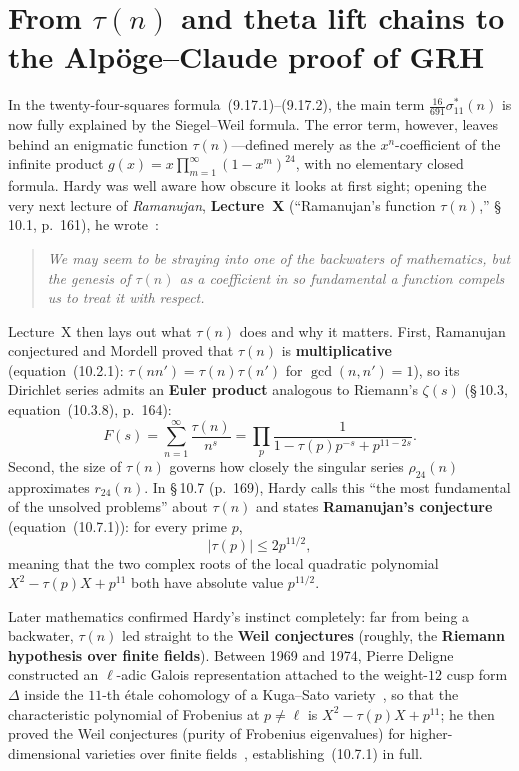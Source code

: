 \section{From \texorpdfstring{$\tau(n)$}{tau(n)} and theta lift chains to the Alpöge--Claude proof of GRH}

In the twenty-four-squares formula~(9.17.1)--(9.17.2), the main term $\frac{16}{691}\sigma_{11}^*(n)$ is now fully explained by the Siegel--Weil formula. The error term, however, leaves behind an enigmatic function $\tau(n)$---defined merely as the $x^n$-coefficient of the infinite product $g(x)=x\prod_{m=1}^{\infty}(1-x^m)^{24}$, with no elementary closed formula. Hardy was well aware how obscure it looks at first sight; opening the very next lecture of \emph{Ramanujan}, \textbf{Lecture~X} (``Ramanujan's function $\tau(n)$,'' \S\,10.1, p.~161), he wrote~\cite{Hardy1940}:
\begin{quote}
\itshape
We may seem to be straying into one of the backwaters of mathematics, but the genesis of $\tau(n)$ as a coefficient in so fundamental a function compels us to treat it with respect.
\end{quote}

Lecture~X then lays out what $\tau(n)$ does and why it matters. First, Ramanujan conjectured and Mordell proved that $\tau(n)$ is \textbf{multiplicative} (equation~(10.2.1): $\tau(nn')=\tau(n)\tau(n')$ for $\gcd(n,n')=1$), so its Dirichlet series admits an \textbf{Euler product} analogous to Riemann's $\zeta(s)$ (\S\,10.3, equation~(10.3.8), p.~164):
\begin{equation*}\tag{10.3.8}
F(s)=\sum_{n=1}^{\infty}\frac{\tau(n)}{n^s}=\prod_{p}\frac{1}{1-\tau(p)p^{-s}+p^{11-2s}}.
\end{equation*}
Second, the size of $\tau(n)$ governs how closely the singular series $\rho_{24}(n)$ approximates $r_{24}(n)$. In \S\,10.7 (p.~169), Hardy calls this ``the most fundamental of the unsolved problems'' about $\tau(n)$ and states \textbf{Ramanujan's conjecture} (equation~(10.7.1)): for every prime $p$,
\begin{equation*}\tag{10.7.1}
|\tau(p)|\le 2p^{11/2},
\end{equation*}
meaning that the two complex roots of the local quadratic polynomial $X^2-\tau(p)X+p^{11}$ both have absolute value $p^{11/2}$.

Later mathematics confirmed Hardy's instinct completely: far from being a backwater, $\tau(n)$ led straight to the \textbf{Weil conjectures} (roughly, the \textbf{Riemann hypothesis over finite fields}). Between 1969 and 1974, Pierre Deligne constructed an $\ell$-adic Galois representation attached to the weight-$12$ cusp form $\Delta$ inside the $11$-th étale cohomology of a Kuga--Sato variety~\cite{Deligne1971}, so that the characteristic polynomial of Frobenius at $p\ne\ell$ is $X^2-\tau(p)X+p^{11}$; he then proved the Weil conjectures (purity of Frobenius eigenvalues) for higher-dimensional varieties over finite fields~\cite{Deligne1974}, establishing~(10.7.1) in full.

